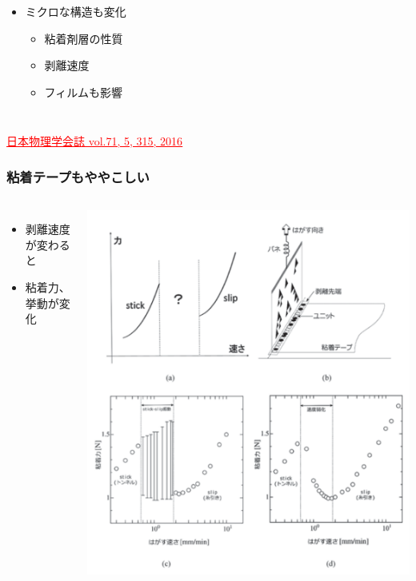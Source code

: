 \documentclass[unicode,12pt]{beamer}%
\begin{document}
\begin{frame}
\begin{columns}[c, onlytextwidth]
		\begin{itemize}
			\item ミクロな構造も変化
			\begin{itemize}
				\item 粘着剤層の性質
				\item 剥離速度
				\item フィルムも影響
			\end{itemize}
		\end{itemize}
	\end{columns}

	\href{https://www.jps.or.jp/books/gakkaishi/2016/05/71-05mijika.pdf}{\textcolor{red}{\underline{\scriptsize{日本物理学会誌 vol.71, 5, 315, 2016}}}}
\end{frame}

\begin{frame}
	\frametitle{粘着テープもややこしい}
	\begin{columns}[c, onlytextwidth]
		\begin{itemize}
			\item 剥離速度が変わると
			\item 粘着力、挙動が変化
		\end{itemize}
		\centering
		\includegraphics[width=.8\textwidth]{hakuri3.png}


\end{columns}
\end{frame}
\end{document}
